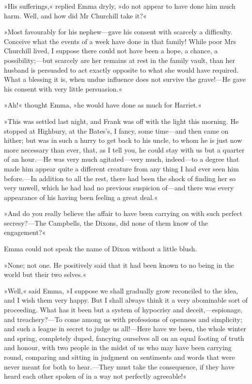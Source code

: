»His sufferings,« replied Emma dryly, »do not appear to have done him much harm. Well, and how did Mr Churchill take it?«

»Most favourably for his nephew—gave his consent with scarcely a difficulty. Conceive what the events of a week have done in that family! While poor Mrs Churchill lived, I suppose there could not have been a hope, a chance, a possibility;—but scarcely are her remains at rest in the family vault, than her husband is persuaded to act exactly opposite to what she would have required. What a blessing it is, when undue influence does not survive the grave!—He gave his consent with very little persuasion.«

»Ah!« thought Emma, »he would have done as much for Harriet.«

»This was settled last night, and Frank was off with the light this morning. He stopped at Highbury, at the Bates's, I fancy, some time—and then came on hither; but was in such a hurry to get back to his uncle, to whom he is just now more necessary than ever, that, as I tell you, he could stay with us but a quarter of an hour.—He was very much agitated—very much, indeed—to a degree that made him appear quite a different creature from any thing I had ever seen him before.—In addition to all the rest, there had been the shock of finding her so very unwell, which he had had no previous suspicion of—and there was every appearance of his having been feeling a great deal.«

»And do you really believe the affair to have been carrying on with such perfect secresy?—The Campbells, the Dixons, did none of them know of the engagement?«

Emma could not speak the name of Dixon without a little blush.

»None; not one. He positively said that it had been known to no being in the world but their two selves.«

»Well,« said Emma, »I suppose we shall gradually grow reconciled to the idea, and I wish them very happy. But I shall always think it a very abominable sort of proceeding. What has it been but a system of hypocrisy and deceit,—espionage, and treachery?—To come among us with professions of openness and simplicity; and such a league in secret to judge us all!—Here have we been, the whole winter and spring, completely duped, fancying ourselves all on an equal footing of truth and honour, with two people in the midst of us who may have been carrying round, comparing and sitting in judgment on sentiments and words that were never meant for both to hear.—They must take the consequence, if they have heard each other spoken of in a way not perfectly agreeable!«

